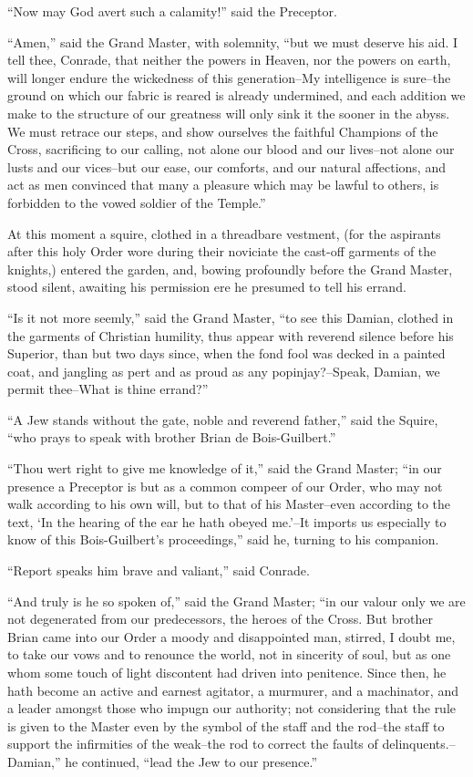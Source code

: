 ``Now may God avert such a calamity!'' said the Preceptor.

``Amen,'' said the Grand Master, with solemnity, ``but we must deserve
his aid. I tell thee, Conrade, that neither the powers in Heaven, nor
the powers on earth, will longer endure the wickedness of this
generation--My intelligence is sure--the ground on which our fabric is
reared is already undermined, and each addition we make to the structure
of our greatness will only sink it the sooner in the abyss. We must
retrace our steps, and show ourselves the faithful Champions of the
Cross, sacrificing to our calling, not alone our blood and our
lives--not alone our lusts and our vices--but our ease, our comforts,
and our natural affections, and act as men convinced that many a
pleasure which may be lawful to others, is forbidden to the vowed
soldier of the Temple.''

At this moment a squire, clothed in a threadbare vestment, (for the
aspirants after this holy Order wore during their noviciate the cast-off
garments of the knights,) entered the garden, and, bowing profoundly
before the Grand Master, stood silent, awaiting his permission ere he
presumed to tell his errand.

``Is it not more seemly,'' said the Grand Master, ``to see this Damian,
clothed in the garments of Christian humility, thus appear with reverend
silence before his Superior, than but two days since, when the fond fool
was decked in a painted coat, and jangling as pert and as proud as any
popinjay?--Speak, Damian, we permit thee--What is thine errand?''

``A Jew stands without the gate, noble and reverend father,'' said the
Squire, ``who prays to speak with brother Brian de Bois-Guilbert.''

``Thou wert right to give me knowledge of it,'' said the Grand Master;
``in our presence a Preceptor is but as a common compeer of our Order,
who may not walk according to his own will, but to that of his
Master--even according to the text, `In the hearing of the ear he hath
obeyed me.'--It imports us especially to know of this Bois-Guilbert's
proceedings,'' said he, turning to his companion.

``Report speaks him brave and valiant,'' said Conrade.

``And truly is he so spoken of,'' said the Grand Master; ``in our valour
only we are not degenerated from our predecessors, the heroes of the
Cross. But brother Brian came into our Order a moody and disappointed
man, stirred, I doubt me, to take our vows and to renounce the world,
not in sincerity of soul, but as one whom some touch of light discontent
had driven into penitence. Since then, he hath become an active and
earnest agitator, a murmurer, and a machinator, and a leader amongst
those who impugn our authority; not considering that the rule is given
to the Master even by the symbol of the staff and the rod--the staff to
support the infirmities of the weak--the rod to correct the faults of
delinquents.--Damian,'' he continued, ``lead the Jew to our presence.''

